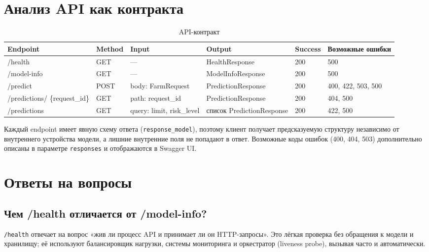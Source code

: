 \documentclass[12pt,a4paper]{article}
\begin{document}
\section{Анализ API как контракта}

\begin{table}[H]
\centering
\caption{API-контракт}
\small
\setlength{\tabcolsep}{4pt}
\begin{tabular}{|L{3.1cm}|L{1.6cm}|L{2.6cm}|L{3.7cm}|L{1.6cm}|L{2.2cm}|}
\hline
\textbf{Endpoint} & \textbf{Method} & \textbf{Input} & \textbf{Output} & \textbf{Success} & \textbf{Возможные ошибки} \\
\hline
/health & GET & --- & HealthResponse & 200 & 500 \\
\hline
/model-info & GET & --- & ModelInfoResponse & 200 & 500 \\
\hline
/predict & POST & body: FarmRequest & PredictionResponse & 200 & 400, 422, 503, 500 \\
\hline
/predictions/ \newline \{request\_id\} & GET & path: request\_id & PredictionResponse & 200 & 404, 500 \\
\hline
/predictions & GET & query: limit, risk\_level & список PredictionResponse & 200 & 422, 500 \\
\hline
\end{tabular}
\end{table}

Каждый endpoint имеет явную схему ответа (\texttt{response\_model}), поэтому клиент получает предсказуемую структуру независимо от внутреннего устройства модели, а лишние внутренние поля не попадают в ответ. Возможные коды ошибок (400, 404, 503) дополнительно описаны в параметре \texttt{responses} и отображаются в Swagger UI.

\section{Ответы на вопросы}

\subsection{Чем /health отличается от /model-info?}

\texttt{/health} отвечает на вопрос «жив ли процесс API и принимает ли он HTTP-запросы». Это лёгкая проверка без обращения к модели и хранилищу; её используют балансировщик нагрузки, системы мониторинга и оркестратор (liveness probe), вызывая часто и автоматически.
\end{document}
